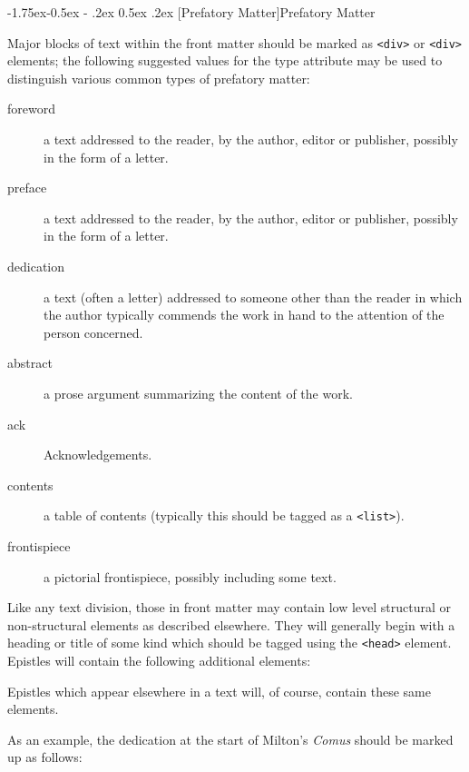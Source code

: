 \documentclass[11pt,twoside]{article}\makeatletter
\makeatletter
\renewcommand\subsection{\@startsection{subsection}{2}{\z@}%
     {-1.75ex\@plus -0.5ex \@minus- .2ex}%
     {0.5ex \@plus .2ex}%
     {\reset@font\Large\sffamily}}
\renewcommand\subsubsection{\@startsection{subsubsection}{3}{\z@}%
     {-1.5ex\@plus -0.35ex \@minus -.2ex}%
     {0.5ex \@plus .2ex}%
     {\reset@font\large\sffamily}}
\def\DivIII{\subsubsection}
\def\DivIII{\subsection}
\makeatother
\begin{document}
\DivIII[Prefatory Matter]{Prefatory Matter}\label{h52}\par Major blocks of text within the front matter should be marked as
\texttt{<div>} or \texttt{<div>} elements; the following suggested
values for the type attribute may be used to
distinguish various common types of prefatory matter:
\begin{description}

\item[foreword]a text addressed to the reader, by the author, editor or
publisher, possibly in the form of a letter.
\item[preface]a text addressed to the reader, by the author, editor or
publisher, possibly in the form of a letter.
\item[dedication]a text (often a letter) addressed to someone other than the
reader in which the author typically commends the work in hand to the
attention of the person concerned.
\item[abstract]a prose argument summarizing the content of the work.
\item[ack]Acknowledgements.
\item[contents]a table of contents (typically this should be tagged as a
\texttt{<list>}).
\item[frontispiece]a pictorial frontispiece, possibly including some text.
\end{description} \par Like any text division, those in front matter may contain low
level structural or non-structural elements as described elsewhere.
They will generally begin with a heading or title of some kind which
should be tagged using the \texttt{<head>} element. Epistles will
contain the following additional elements:
\par  Epistles which appear elsewhere in a text will, of course,
contain these same elements.\par As an example, the dedication at the start of Milton's
\textit{Comus} should be marked up as follows:
\end{document}
